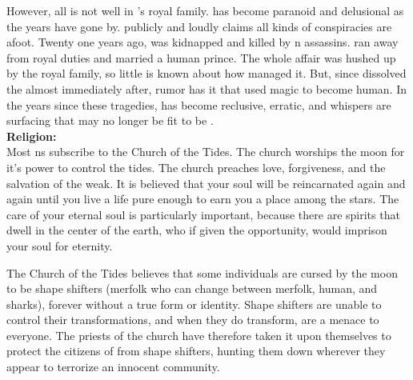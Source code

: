 \documentclass[blue]{NeptuneBall}
\begin{document}
However, all is not well in \pAtlantis{}'s royal family. \cPlant{\Prince} \cPlant{} has become paranoid and delusional as the years have gone by. \cPlant{\They} publicly and loudly claims all kinds of conspiracies are afoot. Twenty one years ago, \cQueen{\King} \cQueen{} was kidnapped and killed by \pPacifica{}n assassins. \cAriel{\Prince} \cAriel{} ran away from \cAriel{\their} royal duties and married a human prince. The whole affair was hushed up by the royal family, so little is known about how \cAriel{\they{}} managed it. But, since \cKing{} dissolved the \pMagician{} almost immediately after, rumor has it that \cAriel{\they} used magic to become human. In the years since these tragedies, \cKing{\they{}} has become reclusive, erratic, and whispers are surfacing that \cKing{\they{}} may no longer be fit to be \cKing{\King}.\\

{\bf Religion:}\\
Most \pAtlantis{}ns subscribe to the Church of the Tides. The church worships the moon for it's power to control the tides. The church preaches love, forgiveness, and the salvation of the weak. It is believed that your soul will be reincarnated again and again until you live a life pure enough to earn you a place among the stars. The care of your eternal soul is particularly important, because there are spirits that dwell in the center of the earth, who if given the opportunity, would imprison your soul for eternity.

The Church of the Tides believes that some individuals are cursed by the moon to be shape shifters (merfolk who can change between merfolk, human, and sharks), forever without a true form or identity. Shape shifters are unable to control their transformations, and when they do transform, are a menace to everyone. The priests of the church have therefore taken it upon themselves to protect the citizens of \pAtlantis{} from shape shifters, hunting them down wherever they appear to terrorize an innocent community.\\
\end{document}
